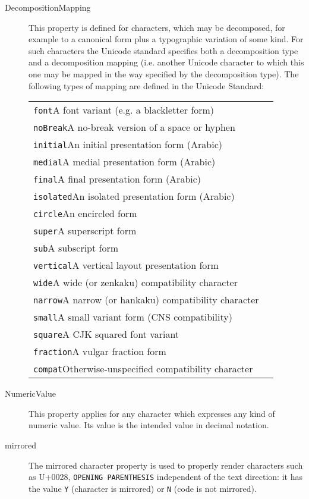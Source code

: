 \begin{description}
\item[{Decomposition\textunderscore Mapping}]This property is defined for characters, which may be decomposed, for example to a canonical form plus a typographic variation of some kind. For such characters the Unicode standard specifies both a decomposition type and a decomposition mapping (i.e. another Unicode character to which this one may be mapped in the way specified by the decomposition type). The following types of mapping are defined in the Unicode Standard:  \par 
\begin{longtable}{P{0.2634114583333333\textwidth}P{0.5865885416666666\textwidth}}
\texttt{font}\tabcellsep A font variant (e.g. a blackletter form)\\
\texttt{noBreak}\tabcellsep A no-break version of a space or hyphen\\
\texttt{initial}\tabcellsep An initial presentation form (Arabic)\\
\texttt{medial}\tabcellsep A medial presentation form (Arabic)\\
\texttt{final}\tabcellsep A final presentation form (Arabic)\\
\texttt{isolated}\tabcellsep An isolated presentation form (Arabic)\\
\texttt{circle}\tabcellsep An encircled form\\
\texttt{super}\tabcellsep A superscript form\\
\texttt{sub}\tabcellsep A subscript form\\
\texttt{vertical}\tabcellsep A vertical layout presentation form\\
\texttt{wide}\tabcellsep A wide (or zenkaku) compatibility character\\
\texttt{narrow}\tabcellsep A narrow (or hankaku) compatibility character\\
\texttt{small}\tabcellsep A small variant form (CNS compatibility)\\
\texttt{square}\tabcellsep A CJK squared font variant\\
\texttt{fraction}\tabcellsep A vulgar fraction form\\
\texttt{compat}\tabcellsep Otherwise-unspecified compatibility character\end{longtable} \par
 
\item[{Numeric\textunderscore Value}]This property applies for any character which expresses any kind of numeric value. Its value is the intended value in decimal notation.
\item[{mirrored}]The mirrored character property is used to properly render characters such as U+0028, \texttt{OPENING PARENTHESIS} independent of the text direction: it has the value \texttt{Y} (character is mirrored) or \texttt{N} (code is not mirrored).
\end{description} \par
